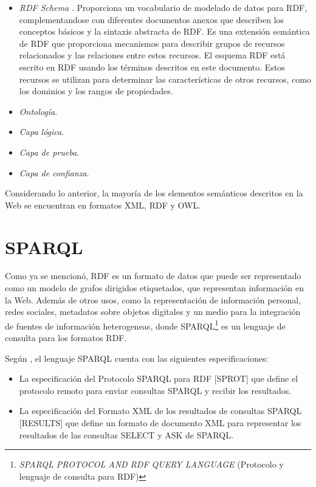 \begin{itemize}
    \item \textit{RDF Schema} \cite{W3C_RDFSchema}. Proporciona un vocabulario de modelado de datos para RDF, complementandose con diferentes documentos anexos que describen los conceptos básicos y la sintaxis abstracta de RDF. Es una extensión semántica de RDF que proporciona mecanismos para describir grupos de recursos relacionados y las relaciones entre estos recursos. El esquema RDF está escrito en RDF usando los términos descritos en este documento. Estos recursos se utilizan para determinar las características de otros recursos, como los dominios y los rangos de propiedades.
    
    \item \textit{Ontología}. 
    
    \item \textit{Capa lógica}.
    
    \item \textit{Capa de prueba}.
    
    \item \textit{Capa de confianza}.

\end{itemize}

Considerando lo anterior, la mayoría de los elementos semánticos descritos en la Web se encuentran en formatos XML, RDF y OWL.\newline


\section{SPARQL}

Como ya se mencionó, RDF es un formato de datos que puede ser representado como un modelo de grafos dirigidos etiquetados, que representan información en la Web. Además de otros usos, como la representación de información personal, redes sociales, metadatos sobre objetos digitales y un medio para la integración de fuentes de información heterogeneas, donde SPARQL\footnote{\textit{SPARQL PROTOCOL AND RDF QUERY LANGUAGE} (Protocolo y lenguaje de consulta para RDF)} es un lenguaje de consulta para los formatos RDF.\newline

Según \cite{Skos_Sparql}, el lenguaje SPARQL cuenta con las siguientes especificaciones:

\begin{itemize}
    \item La especificación del Protocolo SPARQL para RDF [SPROT] que define el protocolo remoto para enviar consultas SPARQL y recibir los resultados.
    \item La especificación del Formato XML de los resultados de consultas SPARQL [RESULTS] que define un formato de documento XML para representar los resultados de las consultas SELECT y ASK de SPARQL.
\end{itemize}

